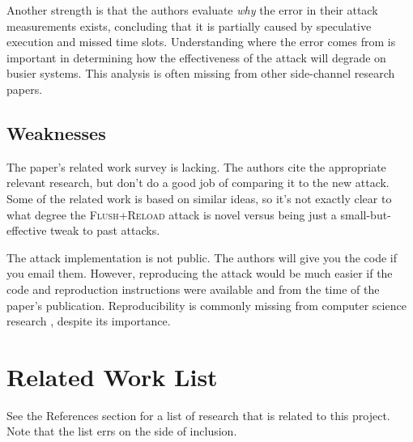 \documentclass{acm_proc_article-sp}
\begin{document}
Another strength is that the authors evaluate \emph{why} the error in their
attack measurements exists, concluding that it is partially caused by
speculative execution and missed time slots. Understanding where the error comes
from is important in determining how the effectiveness of the attack will
degrade on busier systems. This analysis is often missing from other
side-channel research papers.

\subsection{Weaknesses}

The paper's related work survey is lacking. The authors cite the appropriate
relevant research, but don't do a good job of comparing it to the new attack.
Some of the related work is based on similar ideas, so it's not exactly clear to
what degree the \textsc{Flush+Reload} attack is novel versus being just
a small-but-effective tweak to past attacks.

The attack implementation is not public. The authors will give you the code if
you email them. However, reproducing the attack would be much easier if the code
and reproduction instructions were available and from the time of the paper's
publication. Reproducibility is commonly missing from computer science research
\cite{moraila2013measuring}, despite its importance.

\section{Related Work List}

See the References section for a list of research that is related to this
project. Note that the list errs on the side of inclusion.

\nocite{*}



\end{document}
